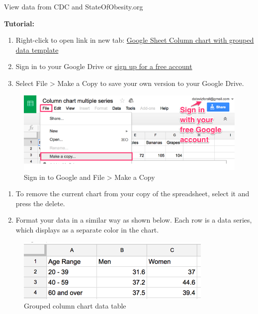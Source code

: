 \documentclass[
  english,
]{book}
\begin{document}
View data from CDC and StateOfObesity.org

\textbf{Tutorial:}

\begin{enumerate}
\def\labelenumi{\arabic{enumi})}
\item
  Right-click to open link in new tab: \href{https://docs.google.com/spreadsheets/d/1ltA9siijVSDkTE3fzB3UaWHO7dotBIrGH4R9wI_Qyqw/}{Google Sheet Column chart with grouped data template}
\item
  Sign in to your Google Drive or \href{http://sheets.google.com}{sign up for a free account}
\item
  Select File \textgreater{} Make a Copy to save your own version to your Google Drive.
\end{enumerate}

\begin{figure}
\centering
\includegraphics{images/05-chart/column-make-copy.png}
\caption{Sign in to Google and File \textgreater{} Make a Copy}
\end{figure}

\begin{enumerate}
\def\labelenumi{\arabic{enumi})}
\setcounter{enumi}{3}
\item
  To remove the current chart from your copy of the spreadsheet, select it and press the delete.
\item
  Format your data in a similar way as shown below. Each row is a data series, which displays as a separate color in the chart.
\end{enumerate}

\begin{figure}
\centering
\includegraphics{images/05-chart/grouped-column-chart-data.png}
\caption{Grouped column chart data table}
\end{figure}
\end{document}
